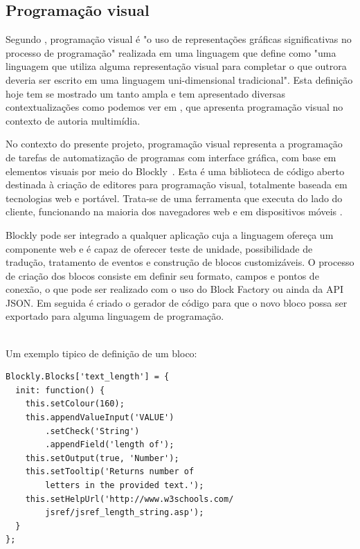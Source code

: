 \documentclass[12pt]{article}
\begin{document}
	\subsection{Programação visual}
	
	Segundo \citeauthor{visualProgram}\cite{visualProgram}, programação visual é "o uso de representações gráficas significativas no processo de programação" realizada em uma linguagem que \citeauthor{visualProgram} define como "uma linguagem que utiliza alguma representação visual para completar o que outrora deveria ser escrito em uma linguagem uni-dimensional tradicional". Esta definição hoje tem se mostrado um tanto ampla e tem apresentado diversas contextualizações como podemos ver em \cite{visualProgAuth}, que apresenta programação visual no contexto de autoria multimídia.
	
	No contexto do presente projeto, programação visual representa a programação de tarefas de automatização de programas com interface gráfica, com base em elementos visuais por meio do Blockly~\cite{blockly}. Esta é uma biblioteca de código aberto destinada à criação de editores para programação visual, totalmente baseada em tecnologias web e portável. Trata-se de uma ferramenta que executa do lado do cliente, funcionando na maioria dos navegadores web e em dispositivos móveis \cite{blockly}.
	
	Blockly pode ser integrado a qualquer aplicação cuja a linguagem ofereça um componente web e é capaz de oferecer teste de unidade, possibilidade de tradução, tratamento de eventos e construção de blocos customizáveis. O processo de criação dos blocos consiste em definir seu formato, campos e pontos de conexão, o que pode ser realizado com o uso do Block Factory ou ainda da API JSON. 
	Em seguida é criado o gerador de código para que o novo bloco possa ser exportado para alguma linguagem de programação.
	
	~\\
	Um exemplo tipico de definição de um bloco:
	

	\begin{lstlisting}[frame=single]
Blockly.Blocks['text_length'] = {
  init: function() {
	this.setColour(160);
	this.appendValueInput('VALUE')
		.setCheck('String')
		.appendField('length of');
	this.setOutput(true, 'Number');
	this.setTooltip('Returns number of 
		letters in the provided text.');
	this.setHelpUrl('http://www.w3schools.com/
		jsref/jsref_length_string.asp');
  }
};
    \end{lstlisting}
    
\end{document}
